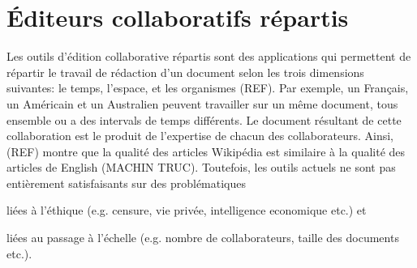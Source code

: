 
\chapter{Éditeurs collaboratifs répartis}

Les outils d'édition collaborative répartis sont des applications qui
permettent de répartir le travail de rédaction d'un document selon les trois
dimensions suivantes: le temps, l'espace, et les organismes (REF). Par exemple,
un Français, un Américain et un Australien peuvent travailler sur un même
document, tous ensemble ou a des intervals de temps différents.  Le document
résultant de cette collaboration est le produit de l'expertise de chacun des
collaborateurs. Ainsi, (REF) montre que la qualité des articles Wikipédia est
similaire à la qualité des articles de English (MACHIN TRUC). Toutefois, les
outils actuels ne sont pas entièrement satisfaisants sur des problématiques
\begin{inparaenum}[(i)]
\item liées à l'éthique (e.g. censure, vie privée, intelligence economique
  etc.) et
\item liées au passage à l'échelle (e.g. nombre de collaborateurs, taille des
  documents etc.).
\end{inparaenum}

